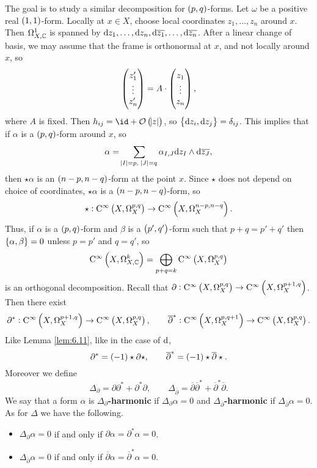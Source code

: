 The goal is to study a similar decomposition for $ \br{p, q} $-forms. Let $ \omega $ be a positive real $ \br{1, 1} $-form. Locally at $ x \in X $, choose local coordinates $ z_1, \dots, z_n $ around $ x $. Then $ \Omega_{X, \mathbb{C}}^1 $ is spanned by $ \mathrm{d} z_1, \dots, \mathrm{d} z_n, \mathrm{d}\overline{z_1}, \dots, \mathrm{d}\overline{z_n} $. After a linear change of basis, we may assume that the frame is orthonormal at $ x $, and not locally around $ x $, so
$$ \begin{pmatrix} z_1' \\ \vdots \\ z_n' \end{pmatrix} = A \cdot \begin{pmatrix} z_1 \\ \vdots \\ z_n \end{pmatrix}, $$
where $ A $ is fixed. Then $ h_{ij} = \id + \OOO\br{\abs{z}} $, so $ \cbr{\d z_i, \d z_j} = \delta_{ij} $. This implies that if $ \alpha $ is a $ \br{p, q} $-form around $ x $, so
$$ \alpha = \sum_{\abs{I} = p, \ \abs{J} = q} \alpha_{I, J} \mathrm{d} z_I \wedge \mathrm{d}\overline{z_J}, $$
then $ \star\alpha $ is an $ \br{n - p, n - q} $-form at the point $ x $. Since $ \star $ does not depend on choice of coordinates, $ \star\alpha $ is a $ \br{n - p, n - q} $-form, so
$$ \star : \C^\infty\br{X, \Omega_X^{p, q}} \to \C^\infty\br{X, \Omega_X^{n - p, n - q}}. $$
Thus, if $ \alpha $ is a $ \br{p, q} $-form and $ \beta $ is a $ \br{p', q'} $-form such that $ p + q = p' + q' $ then $ \cbr{\alpha, \beta} = 0 $ unless $ p = p' $ and $ q = q' $, so
$$ \C^\infty\br{X, \Omega_{X, \CC}^k} = \bigoplus_{p + q = k} \C^\infty\br{X, \Omega_X^{p, q}} $$
is an orthogonal decomposition. Recall that $ \partial : \C^\infty\br{X, \Omega_X^{p, q}} \to \C^\infty\br{X, \Omega_X^{p + 1, q}} $. Then there exist
$$ \partial^* : \C^\infty\br{X, \Omega_X^{p + 1, q}} \to \C^\infty\br{X, \Omega_X^{p, q}}, \qquad \overline{\partial}^* : \C^\infty\br{X, \Omega_X^{p, q + 1}} \to \C^\infty\br{X, \Omega_X^{p, q}}. $$
Like Lemma \ref{lem:6.11}, like in the case of $ \mathrm{d} $,
$$ \partial^* = \br{-1}\star\partial\star, \qquad \overline{\partial}^* = \br{-1}\star\overline{\partial}\star. $$
Moreover we define
$$ \Delta_\partial = \partial\partial^* + \partial^*\partial, \qquad \Delta_{\overline{\partial}} = \overline{\partial}\overline{\partial}^* + \overline{\partial}^*\overline{\partial}. $$
We say that a form $ \alpha $ is \textbf{$ \Delta_\partial $-harmonic} if $ \Delta_\partial\alpha = 0 $ and \textbf{$ \Delta_{\overline{\partial}} $-harmonic} if $ \Delta_{\overline{\partial}}\alpha = 0 $. As for $ \Delta $ we have the following.

\pagebreak

\begin{lemma}
\hfill
\begin{itemize}
\item $ \Delta_\partial\alpha = 0 $ if and only if $ \partial\alpha = \partial^*\alpha = 0 $.
\item $ \Delta_{\overline{\partial}}\alpha = 0 $ if and only if $ \overline{\partial}\alpha = \overline{\partial}^*\alpha = 0 $.
\end{itemize}
\end{lemma}

